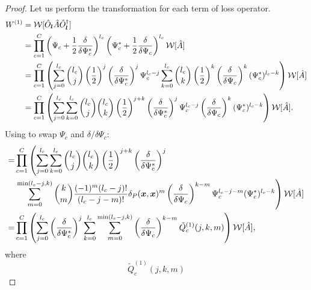\begin{proof}
Let us perform the transformation for each term of loss operator.
\begin{equation*}
\begin{split}
	W^{(1)}
	& = \mathcal{W}[\hat{O}_{\boldsymbol{l}} \hat{A} \hat{O}_{\boldsymbol{l}}^\dagger] \\
	& = \prod_{c=1}^C \left(
			\Psi_c + \frac{1}{2} \frac{\delta}{\delta \Psi_c^*}
		\right)^{l_c}
		\left(
			\Psi_c^* + \frac{1}{2} \frac{\delta}{\delta \Psi_c}
		\right)^{l_c}
		\mathcal{W}[\hat{A}] \\
	& = \prod_{c=1}^C \left(
			\sum_{j=0}^{l_c}
				\binom{l_c}{j} \left( \frac{1}{2} \right)^j
				\left( \frac{\delta}{\delta \Psi_c^*} \right)^j
				\Psi_c^{l_c - j}
			\sum_{k=0}^{l_c}
				\binom{l_c}{k} \left( \frac{1}{2} \right)^k
				\left( \frac{\delta}{\delta \Psi_c} \right)^k
				(\Psi_c^*)^{l_c - k}
		\right)
		\mathcal{W}[\hat{A}] \\
	& = \prod_{c=1}^C \left(
			\sum_{j=0}^{l_c}
			\sum_{k=0}^{l_c}
				\binom{l_c}{j} \binom{l_c}{k} \left( \frac{1}{2} \right)^{j + k}
				\left( \frac{\delta}{\delta \Psi_c^*} \right)^j
				\Psi_c^{l_c - j}
				\left( \frac{\delta}{\delta \Psi_c} \right)^k
				(\Psi_c^*)^{l_c - k}
		\right)
		\mathcal{W}[\hat{A}].
\end{split}
\end{equation*}
Using  to swap $\Psi_c$ and $\delta / \delta \Psi_c$:
\begin{equation*}
\begin{split}
	= & \prod_{c=1}^C \left(
			\sum_{j=0}^{l_c}
			\sum_{k=0}^{l_c}
				\binom{l_c}{j} \binom{l_c}{k} \left( \frac{1}{2} \right)^{j + k}
				\left( \frac{\delta}{\delta \Psi_c^*} \right)^j
		\right. \\
		& \left.
				\sum_{m=0}^{\min(l_c - j, k)}
					\binom{k}{m}
					\frac{(-1)^m (l_c - j)!}{(l_c - j - m)!}
					\delta_P(\boldsymbol{x}, \boldsymbol{x})^m
					\left( \frac{\delta}{\delta \Psi_c} \right)^{k - m}
					\Psi_c^{l_c - j - m}
				(\Psi_c^*)^{l_c - k}
		\right)
		\mathcal{W}[\hat{A}] \\
	= & \prod_{c=1}^C \left(
			\sum_{j=0}^{l_c}
				\left( \frac{\delta}{\delta \Psi_c^*} \right)^j
			\sum_{k=0}^{l_c}
			\sum_{m=0}^{\min(l_c - j, k)}
				\left( \frac{\delta}{\delta \Psi_c} \right)^{k - m}
				\tilde{Q}_c^{(1)}(j, k, m)
		\right)
		\mathcal{W}[\hat{A}],
\end{split}
\end{equation*}
where
\[
	\tilde{Q}_c^{(1)}(j, k, m)
\]
\end{proof}
